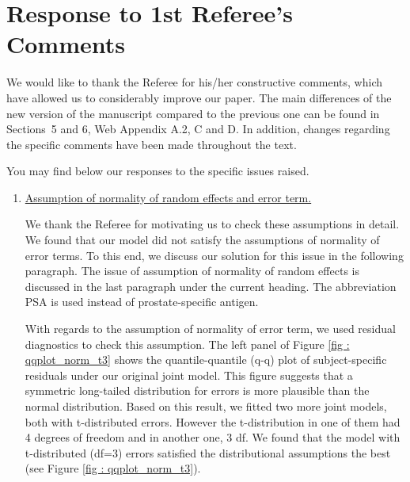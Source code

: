 \clearpage
\section*{Response to 1st Referee's Comments}
We would like to thank the Referee for his/her constructive comments, which have allowed us to considerably improve our paper. The main differences of the new version of the manuscript compared to the previous one can be found in Sections~5 and 6, Web Appendix A.2, C and D. In addition, changes regarding the specific comments have been made throughout the text.

You may find below our responses to the specific issues raised.

\begin{enumerate}

    \item 
    \underline{Assumption of normality of random effects and error term.}

    We thank the Referee for motivating us to check these assumptions in detail. We found that our model did not satisfy the assumptions of normality of error terms. To this end, we discuss our solution for this issue in the following paragraph. The issue of assumption of normality of random effects is discussed in the last paragraph under the current heading. The abbreviation PSA is used instead of prostate-specific antigen.

    With regards to the assumption of normality of error term, we used residual diagnostics to check this assumption. The left panel of Figure \ref{fig : qqplot_norm_t3} shows the quantile-quantile (q-q) plot of subject-specific residuals under our original joint model. This figure suggests that a symmetric long-tailed distribution for errors is more plausible than the normal distribution. Based on this result, we fitted two more joint models, both with t-distributed errors. However the t-distribution in one of them had 4 degrees of freedom and in another one, 3 df. We found that the model with t-distributed (df=3) errors satisfied the distributional assumptions the best (see Figure \ref{fig : qqplot_norm_t3}). 


\end{enumerate}
